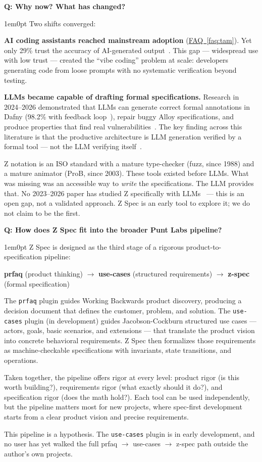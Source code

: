 \documentclass[11pt,letterpaper]{article}
\newcounter{faqnum}
\newenvironment{faqpair}[1]{%
  \needspace{4\baselineskip}%
  \vspace{0.5em}%
  \refstepcounter{faqnum}%
  \noindent\textbf{\color{SectionBlue}Q\thefaqnum: #1}\par\nopagebreak[4]%
  \vspace{0.2em}%
  \begin{adjustwidth}{1em}{0pt}%
  \setlength{\parindent}{0pt}%
}{%
  \end{adjustwidth}%
  \vspace{0.5em}%
}
\newcommand{\faqref}[1]{\hyperref[#1]{FAQ~\ref*{#1}}}
\begin{document}
\begin{faqpair}{Why now? What has changed?}\label{faq:why-now}
Two shifts converged:

\textbf{AI coding assistants reached mainstream adoption} (\faqref{faq:tam}). Yet only 29\% trust the accuracy of AI-generated output~\cite{stackoverflow2025survey}. This gap --- widespread use with low trust --- created the ``vibe coding'' problem at scale: developers generating code from loose prompts with no systematic verification beyond testing.

\textbf{LLMs became capable of drafting formal specifications.} Research in 2024--2026 demonstrated that LLMs can generate correct formal annotations in Dafny (98.2\% with feedback loop~\cite{faria2026dafny}), repair buggy Alloy specifications, and produce properties that find real vulnerabilities~\cite{liu2025propertygpt}. The key finding across this literature is that the productive architecture is LLM generation verified by a formal tool --- not the LLM verifying itself~\cite{jin2025overcorrection,kleppmann2025fvmainstream}.

Z notation is an ISO standard with a mature type-checker (fuzz, since 1988) and a mature animator (ProB, since 2003). These tools existed before LLMs. What was missing was an accessible way to \emph{write} the specifications. The LLM provides that. No 2023--2026 paper has studied Z specifically with LLMs~\cite{ferrari2025roadmap} --- this is an open gap, not a validated approach. Z Spec is an early tool to explore it; we do not claim to be the first.
\end{faqpair}

\begin{faqpair}{How does Z Spec fit into the broader Punt Labs pipeline?}\label{faq:pipeline}
Z Spec is designed as the third stage of a rigorous product-to-specification pipeline:

\textbf{prfaq} (product thinking) $\to$ \textbf{use-cases} (structured requirements) $\to$ \textbf{z-spec} (formal specification)

The \texttt{prfaq} plugin guides Working Backwards product discovery, producing a decision document that defines the customer, problem, and solution. The \texttt{use-cases} plugin (in development) guides Jacobson-Cockburn structured use cases --- actors, goals, basic scenarios, and extensions --- that translate the product vision into concrete behavioral requirements. Z Spec then formalizes those requirements as machine-checkable specifications with invariants, state transitions, and operations.

Taken together, the pipeline offers rigor at every level: product rigor (is this worth building?), requirements rigor (what exactly should it do?), and specification rigor (does the math hold?). Each tool can be used independently, but the pipeline matters most for new projects, where spec-first development starts from a clear product vision and precise requirements.

This pipeline is a hypothesis. The \texttt{use-cases} plugin is in early development, and no user has yet walked the full prfaq $\to$ use-cases $\to$ z-spec path outside the author's own projects.
\end{faqpair}
\end{document}
